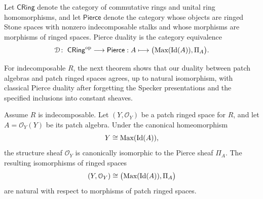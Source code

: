 \documentclass[11pt]{amsart}
\begin{document}
Let $\mathsf{CRing}$ denote the category of commutative rings and unital ring homomorphisms, and let $\mathsf{Pierce}$ denote the category whose objects are ringed Stone spaces with nonzero indecomposable stalks and whose morphisms are morphisms of ringed spaces. Pierce duality \cite[Theorem~6.6, p.~24]{Pierce} is the category equivalence
$$
\mathcal D\colon\;\mathsf{CRing}^{\mathrm{op}}\longrightarrow\mathsf{Pierce}: A\longmapsto\bigl(\mbox{\rm Max}(\mbox{\rm Id}(A)),\Pi_A\bigr).
$$

For indecomposable $R$, the next theorem shows that our duality between patch algebras and patch ringed spaces agrees, up to natural isomorphism, with classical Pierce duality after forgetting the Specker presentations and the specified inclusions into constant sheaves.
 
\begin{theorem}\label{Pierce duality restriction}
Assume $R$ is indecomposable. Let $(Y,\mathcal O_Y)$ be a patch ringed space for $R$, and let $A=\mathcal O_Y(Y)$ be its patch algebra. Under the canonical homeomorphism
$$
Y\cong\mbox{\rm Max}(\operatorname{Id}(A)),
$$
the structure sheaf $\mathcal O_Y$ is canonically isomorphic to the Pierce sheaf $\Pi_A$. The resulting isomorphisms of ringed spaces
$$
(Y,\mathcal O_Y)\cong
\bigl(\mbox{\rm Max}(\operatorname{Id}(A)),\Pi_A\bigr)
$$
are natural with respect to morphisms of patch ringed spaces.
\end{theorem}
\end{document}
